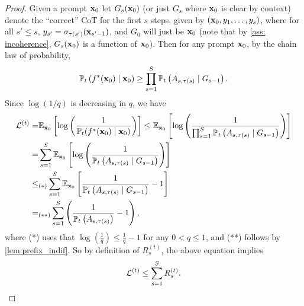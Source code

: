 \documentclass{article}
\theoremstyle{plain}
\theoremstyle{definition}
\theoremstyle{remark}
\begin{document}
\begin{proof}
    Given a prompt $\mathbf{x}_0$ let $G_s(\mathbf{x}_0)$ (or just $G_s$ where $\mathbf{x}_0$ is clear by context) denote the ``correct'' CoT for the first $s$ steps, given by $(\mathbf{x}_0, y_1,\ldots, y_{s})$, where for all $s' \leq s$, $y_{s'} = \sigma_{\tau(s')}(\mathbf{x}_{s'-1})$, and $G_0$ will just be $\mathbf{x}_0$ (note that by \cref{ass: incoherence}, $G_s(\mathbf{x}_0)$ is a function of $\mathbf{x}_0$). Then for any prompt $\mathbf{x}_0$, by the chain law of probability, 
    \begin{align*}
        \mathbb{P}_t\left(f^*(\mathbf{x}_0) \mid \mathbf{x}_0\right) \geq \prod_{s=1}^S \mathbb{P}_t\left(A_{s, \tau(s)}  \mid G_{s-1}\right).
    \end{align*}
    Since $\log\left(1/q\right)$ is decreasing in $q$, we have
    \begin{align*}
        \mathcal{L}^{(t)} = & \mathbb{E}_{\mathbf{x}_0}\left[\log\left(\frac{1}{\mathbb{P}_{t}(f^*(\mathbf{x}_0) \mid \mathbf{x}_0)}\right)\right] \leq \mathbb{E}_{\mathbf{x}_0}\left[\log\left(\frac{1}{\prod_{s=1}^S \mathbb{P}_t\left(A_{s, \tau(s)}  \mid G_{s-1}\right)}\right)\right] \\ 
        = & \sum_{s=1}^S \mathbb{E}_{\mathbf{x}_0}\left[\log\left(\frac{1}{\mathbb{P}_t\left(A_{s, \tau(s)}  \mid G_{s-1}\right)}\right)\right] \\ 
        \leq&_{(*)} \sum_{s=1}^S \mathbb{E}_{\mathbf{x}_0}\left[\frac{1}{\mathbb{P}_t\left(A_{s, \tau(s)}  \mid G_{s-1}\right)} - 1 \right] \\ 
        =&_{(**)} \sum_{s=1}^S \left(\frac{1}{\mathbb{P}_t\left(A_{s, \tau(s)} \right)} - 1\right),
    \end{align*}
    where (*) uses that $\log(\frac{1}{q})\leq \frac{1}{q}-1$ for any $0<q\leq 1$, and (**) follows by \cref{lem:prefix_indif}. So by definition of $R^{(t)}_{s}$, the above equation implies
    \begin{align*}
        \mathcal{L}^{(t)} \leq \sum_{s=1}^S R^{(t)}_{s}.
    \end{align*}
\end{proof}
\end{document}
